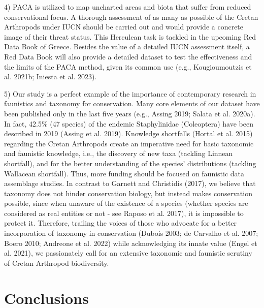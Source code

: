 4) PACA is utilized to map uncharted areas and biota that suffer from reduced
conservational focus. A thorough assessment of as many as possible of the
Cretan Arthropods under IUCN should be carried out and would provide a concrete
image of their threat status. This Herculean task is tackled in the upcoming
Red Data Book of Greece. Besides the value of a detailed IUCN assessment itself,
a Red Data Book will also provide a detailed dataset to test the effectiveness
and the limits of the PACA method, given its common use (e.g., Kougioumoutzis et al. 2021b; Iniesta et al. 2023).

5) Our study is a perfect example of the importance of contemporary research in
faunistics and taxonomy for conservation. Many core elements of our dataset
have been published only in the last five years (e.g., Assing 2019; Salata et al. 2020a).
In fact, 42.5\% (47 species) of the endemic Staphylinidae (Coleoptera) have
been described in 2019 (Assing et al. 2019). Knowledge shortfalls (Hortal et al. 2015)
regarding the Cretan Arthropods create an imperative need for basic taxonomic
and faunistic knowledge, i.e., the discovery of new taxa (tackling Linnean shortfall),
and for the better understanding of the species’ distributions (tackling Wallacean shortfall).
Thus, more funding should be focused on faunistic data assemblage studies.
In contrast to Garnett and Christidis (2017), we believe that taxonomy does not
hinder conservation biology, but instead makes conservation possible,
since when unaware of the existence of a species (whether species are
considered as real entities or not - see Raposo et al. 2017), it is impossible
to protect it. Therefore, trailing the voices of those who advocate for a
better incorporation of taxonomy in conservation (Dubois 2003; de Carvalho et al. 2007; Boero 2010; Andreone et al. 2022)
while acknowledging its innate value (Engel et al. 2021), we passionately call
for an extensive taxonomic and faunistic scrutiny of Cretan Arthropod biodiversity.

\section{Conclusions}
\label{sec:arthropods-conclusions}

